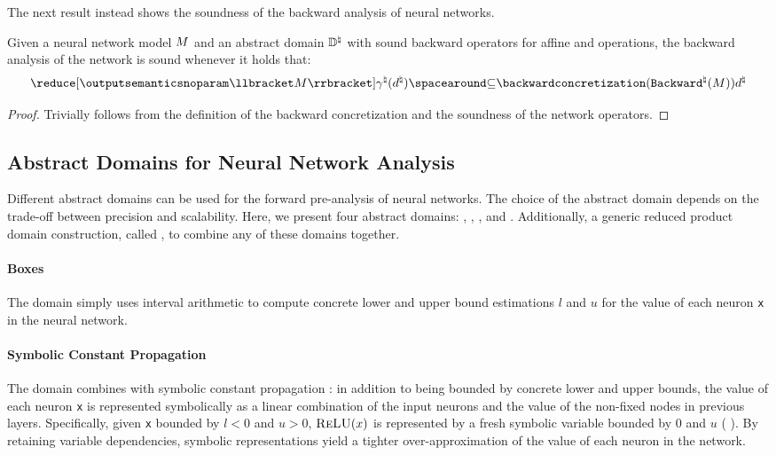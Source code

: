 The next result instead shows the soundness of the backward analysis of neural networks.

\begin{lemma}
  Given a neural network model $M$ and an abstract domain $\mathbb{D}^\natural$ with sound backward operators for affine and \relu{} operations, the backward analysis of the network is sound whenever it holds that:
  \[
    \reduce[\outputsemanticsnoparam\semanticsof{\defmodel}]{\abstractdomainconcretization(\defabstractvalue)} \SubseteQ \backwardconcretization(\abstractdomainbackward(\defmodel))\defabstractvalue
  \]
\end{lemma}
\begin{proof}
  Trivially follows from the definition of the backward concretization and the soundness of the network operators.
\end{proof}


\subsection{Abstract Domains for Neural Network Analysis}

Different abstract domains can be used for the forward pre-analysis of neural networks.
The choice of the abstract domain depends on the trade-off between precision and scalability.
Here, we present four abstract domains: \boxes, \symbolic, \deeppoly, and \neurify. Additionally, a generic reduced product domain construction, called \reducedproduct, to combine any of these domains together.

\paragraph{Boxes}


The \boxes{} domain simply uses interval arithmetic  to compute concrete lower and upper bound estimations $l$ and $u$ for the value of each neuron \texttt{x} in the neural network.


\paragraph{Symbolic Constant Propagation}

The \symbolic{} domain combines \boxes{} with symbolic constant propagation : in addition to being bounded by concrete lower and upper bounds, the value of each neuron \texttt{x} is represented symbolically as a linear combination of the input neurons and the value of the non-fixed \relu{} nodes in previous layers. Specifically, given \texttt{x} bounded by $l < 0$ and $u > 0$, $\textsc{ReLU}(x)$ is represented by a fresh symbolic variable bounded by $0$ and $u$ (\cf{} ). By retaining variable dependencies, symbolic representations yield a tighter over-approximation of the value of each neuron in the network.



